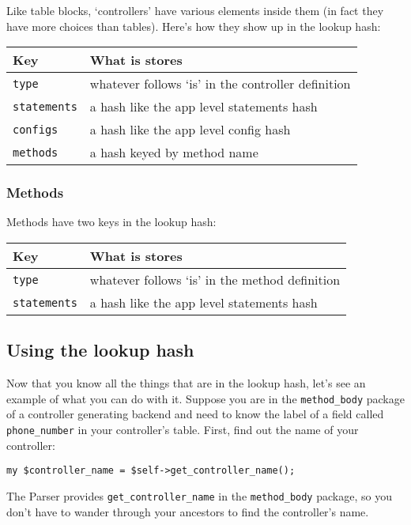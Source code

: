 Like table blocks, `controllers' have various elements inside them (in
fact they have more choices than tables).  Here's how they show up in
the lookup hash:

\begin{tabular}{l|l}
Key & What is stores \\
\hline
\verb+type+       & whatever follows `is' in the controller definition \\
\verb+statements+ & a hash like the app level statements hash          \\
\verb+configs+    & a hash like the app level config hash              \\
\verb+methods+    & a hash keyed by method name                        \\
\end{tabular}

\subsubsection*{Methods}

Methods have two keys in the lookup hash:

\begin{tabular}{l|l}
Key & What is stores \\
\hline
\verb+type+       & whatever follows `is' in the method definition \\
\verb+statements+ & a hash like the app level statements hash      \\
\end{tabular}

\subsection*{Using the lookup hash}

Now that you know all the things that are in the lookup hash, let's see
an example of what you can do with it.  Suppose you are in the
\verb+method_body+ package of a controller generating backend and need to
know the label of a field called \verb+phone_number+ in your controller's
table.  First, find out the name of your controller:

\begin{verbatim}
my $controller_name = $self->get_controller_name();
\end{verbatim}

The Parser provides \verb+get_controller_name+ in the \verb+method_body+
package, so you don't have to wander through your ancestors to find the
controller's name.

